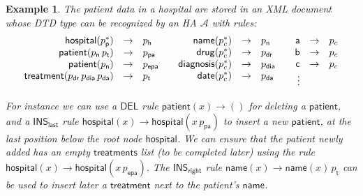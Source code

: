 \documentclass[a4paper]{article}
\theoremstyle{plain}
\newtheorem{example}{Example}{\itshape}{\rmfamily}
\newcommand{\A}{\mathcal{A}}
\newcommand{\INS}{\mathsf{INS}}
\newcommand{\DEL}{\mathsf{DEL}}
\begin{document}
\begin{example} \label{ex:hospital}
The patient data in a hospital are stored in an XML 
document whose DTD type  can be recognized by an HA  $\A$ with rules: 
\[
\begin{array}{ccc}
\begin{array}[t]{rcl}
\mathsf{hospital}(p_\mathsf{p}^*) &\to & p_\mathsf{h}\\
\mathsf{patient}(p_\mathsf{n}\, p_{\mathsf{t}})  &\to & p_\mathsf{pa}\\
\mathsf{patient}(p_{\mathsf{n}}) & \to & p_{\mathsf{epa}}\\
\mathsf{treatment}(p_\mathsf{dr}\,p_\mathsf{dia}\,p_{\mathsf{da}}) &\to & p_\mathsf{t}
\end{array}
&
\begin{array}[t]{rcl}
\mathsf{name}(p_c^*) & \to & p_\mathsf{n} \\
\mathsf{drug}(p_c^*) &\to & p_\mathsf{dr} \\
\mathsf{diagnosis}(p_c^*) & \to & p_\mathsf{dia} \\
\mathsf{date}(p_c^*) &\to & p_{\mathsf{da}}
\end{array}
& 
\begin{array}[t]{rcl}
\mathsf{a} & \to & p_c\\
\mathsf{b} & \to & p_c\\
\mathsf{c} & \to & p_c\\
 \vdots &
\end{array}
\end{array}
\]


  
For instance we can use a $\DEL$ rule $\mathsf{patient}(x) \to ()$ for deleting 
a $\mathsf{patient}$,
and a $\INS_{\mathsf{last}}$ rule
$\mathsf{hospital}(x) \to \mathsf{hospital}(x\,p_{\mathsf{pa}})$ 
to insert a new $\mathsf{patient}$, 
at the last position below the root node $\mathsf{hospital}$. 
We can ensure that the patient newly added has
an empty $\mathsf{treatments}$ list (to be completed later)
using the rule $\mathsf{hospital}(x) \to \mathsf{hospital}(x\,p_{\mathsf{epa}})$.
The $\INS_{\mathsf{right}}$ rule 
$\mathsf{name}(x) \to \mathsf{name}(x)\,p_{\mathsf{t}}$
can be used to insert later a $\mathsf{treatment}$ next to the patient's $\mathsf{name}$.
\end{example}
\end{document}
